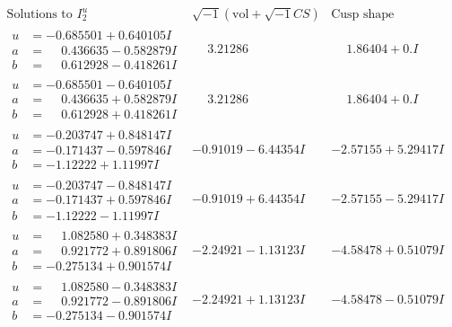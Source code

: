 \documentclass[1p]{elsarticle_modified}
\theoremstyle{definition}
\newcommand{\I}{\sqrt{-1}}
\begin{document}
$$\begin{array}{c|c|c}  
\text{Solutions to }I^u_{2}& \I (\text{vol} + \sqrt{-1}CS) & \text{Cusp shape}\\
 \hline 
\begin{aligned}
u &= -0.685501 + 0.640105 I \\
a &= \phantom{-}0.436635 - 0.582879 I \\
b &= \phantom{-}0.612928 - 0.418261 I\end{aligned}
 & \phantom{-}3.21286\phantom{ +0.000000I} & \phantom{-}1.86404 + 0. I\phantom{ +0.000000I} \\ \hline\begin{aligned}
u &= -0.685501 - 0.640105 I \\
a &= \phantom{-}0.436635 + 0.582879 I \\
b &= \phantom{-}0.612928 + 0.418261 I\end{aligned}
 & \phantom{-}3.21286\phantom{ +0.000000I} & \phantom{-}1.86404 + 0. I\phantom{ +0.000000I} \\ \hline\begin{aligned}
u &= -0.203747 + 0.848147 I \\
a &= -0.171437 - 0.597846 I \\
b &= -1.12222 + 1.11997 I\end{aligned}
 & -0.91019 - 6.44354 I & -2.57155 + 5.29417 I \\ \hline\begin{aligned}
u &= -0.203747 - 0.848147 I \\
a &= -0.171437 + 0.597846 I \\
b &= -1.12222 - 1.11997 I\end{aligned}
 & -0.91019 + 6.44354 I & -2.57155 - 5.29417 I \\ \hline\begin{aligned}
u &= \phantom{-}1.082580 + 0.348383 I \\
a &= \phantom{-}0.921772 + 0.891806 I \\
b &= -0.275134 + 0.901574 I\end{aligned}
 & -2.24921 - 1.13123 I & -4.58478 + 0.51079 I \\ \hline\begin{aligned}
u &= \phantom{-}1.082580 - 0.348383 I \\
a &= \phantom{-}0.921772 - 0.891806 I \\
b &= -0.275134 - 0.901574 I\end{aligned}
 & -2.24921 + 1.13123 I & -4.58478 - 0.51079 I \\ \hline\begin{aligned}

\end{aligned}
\end{array}$$
\end{document}
